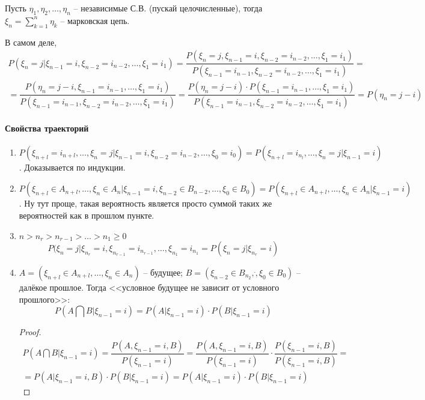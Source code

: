 \begin{ex}
  Пусть $\eta_1, \eta_2, \dots, \eta_n$ -- независимые С.В. (пускай целочисленные),
  тогда $\xi_n = \sum_{k=1}^n \eta_k$ -- марковская цепь.

  В самом деле,
  \begin{multline*}
    P(\xi_n = j | \xi_{n-1} = i, \xi_{n-2} = i_{n-2}, \dots, \xi_1 = i_1)
    = \dfrac{P(\xi_n = j, \xi_{n-1} = i, \xi_{n-2} = i_{n-2}, \dots, \xi_1 = i_1)}{P(\xi_{n-1} = i_{n-1}, \xi_{n-2} = i_{n-2}, \dots, \xi_1 = i_1)} = \\
    = \dfrac{P(\eta_n = j-i, \xi_{n-1}=i_{n-1}, \dots, \xi_1 = i_1 )}{P(\xi_{n-1} = i_{n-1}, \xi_{n-2} = i_{n-2}, \dots, \xi_1 = i_1)}
    = \dfrac{P(\eta_n = j-i) \cdot P(\xi_{n-1}=i_{n-1}, \dots, \xi_1 = i_1 )}{P(\xi_{n-1} = i_{n-1}, \xi_{n-2} = i_{n-2}, \dots, \xi_1 = i_1)}
    = P(\eta_n = j-i)
  \end{multline*}
\end{ex}

\paragraph{Свойства траекторий}

\begin{enumerate}
  \item $P(\xi_{n+l} = i_{n+l}, \dots, \xi_n=j | \xi_{n-1}=i, \xi_{n-2} = i_{n-2}, \dots, \xi_0 = i_0) = P(\xi_{n+l} = i_{n_l}, \dots, \xi_n = j | \xi_{n-1} = i)$.
    Доказывается по индукции.

  \item $P(\xi_{n+l} \in A_{n+l}, \dots, \xi_n\in A_{n} | \xi_{n-1} = i, \xi_{n-2} \in B_{n-2}, \dots, \xi_0 \in B_0) = P(\xi_{n+l} \in A_{n+l}, \dots, \xi_n \in A_n | \xi_{n-1} = i)$. Ну тут проще, такая вероятность является просто суммой таких же вероятностей как в прошлом пункте.

  \item $n > n_r > n_{r-1} > \dots > n_1 \geqslant 0$
    \[
      P(\xi_n = j | \xi_{n_r}=i, \xi_{n_{r-1}} = i_{n_{r-1}}, \dots, \xi_{n_1} = i_{n_1}
      = P(\xi_n=j | \xi_{n_r} = i)
    \]

  \item $A = \left( \xi_{n+l} \in A_{n+l}, \dots, \xi_n \in A_n \right)$ -- будущее;
    $B = \left( \xi_{n-2}\in B_{n_2}, \dot, \xi_0 \in B_0 \right) $ -- далёкое прошлое.
    Тогда <<условное будущее не зависит от условного прошлого>>:
    \[
      P(A \bigcap B | \xi_{n-1} =i) = P(A | \xi_{n-1} = i) \cdot P(B | \xi_{n-1} = i)
    \]
    \begin{proof}
      \begin{multline*}
        P(A \bigcap B | \xi_{n-1} = i) = \dfrac{P(A, \xi_{n-1} = i, B)}{P(\xi_{n-1} = i)} 
        = \dfrac{P(A, \xi_{n-1} = i, B)}{P(\xi_{n-1} = i)} \cdot \dfrac{P(\xi_{n-1}=i, B)}{P(\xi_{n-1}=i, B)} = \\
        = P(A | \xi_{n-1}=i, B) \cdot P(B | \xi_{n-1}=i)
        = P(A | \xi_{n-1}=i) \cdot P(B | \xi_{n-1}=i)
      \end{multline*}
    \end{proof}
\end{enumerate}

